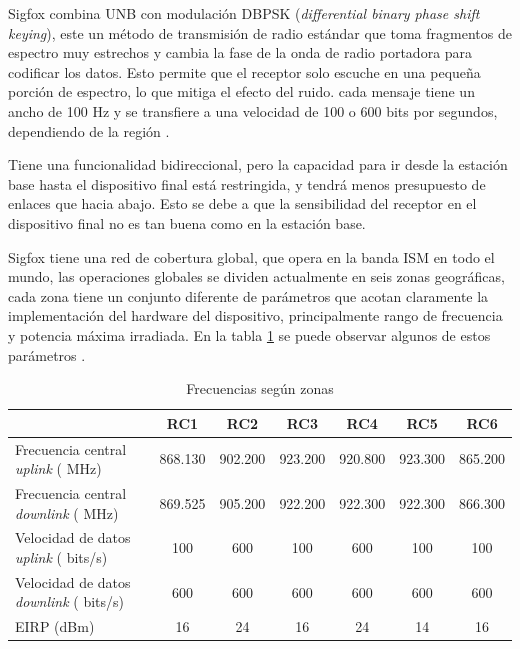 Sigfox combina UNB con modulación  DBPSK (\textit{differential binary phase shift keying}), este un método de transmisión de radio estándar que toma fragmentos de espectro muy estrechos y cambia la fase de la onda de radio portadora para codificar los datos. Esto permite que el receptor solo escuche en una pequeña porción de espectro, lo que mitiga el efecto del ruido. cada mensaje tiene un ancho de 100 Hz y se transfiere a una velocidad de 100 o 600 bits por segundos, dependiendo de la región \cite{RSpec}. %

Tiene una funcionalidad bidireccional, pero la capacidad para ir desde la estación base hasta el dispositivo final está restringida, y tendrá menos presupuesto de enlaces que hacia abajo. Esto se debe a que la sensibilidad del receptor en el dispositivo final no es tan buena como en la estación base.

Sigfox tiene una red de cobertura global, que opera en la banda ISM en todo el mundo, las operaciones globales se dividen actualmente en seis  zonas geográficas, cada zona tiene un conjunto diferente de parámetros que acotan claramente la implementación del hardware del dispositivo, principalmente rango de frecuencia y potencia máxima irradiada. En la tabla \ref{tab:ZonasSigfox} se puede observar algunos de estos parámetros \cite{RConfg}.

\begin{table}[h]
    \small
	\centering
	\caption[Zonas de frecuencia]{Frecuencias según zonas}
	\begin{tabular}{l c c c c c c}    
		\toprule
		\textbf{ } 	   & \textbf{RC1} & \textbf{RC2} 	& \textbf{RC3}  & \textbf{RC4}   & \textbf{RC5}	& \textbf{RC6} \\
		\midrule
		Frecuencia central \textit{uplink} ( MHz)	    & 868.130 	& 902.200	&923.200  &920.800	&923.300 &865.200\\	
		Frecuencia central \textit{downlink} ( MHz) 	& 869.525	& 905.200   &922.200 &922.300	&922.300	&866.300\\
		Velocidad de datos \textit{uplink} ( bits/s)	& 100       &600        &100     &600       &100        &100\\	
		Velocidad de datos \textit{downlink} ( bits/s)	& 600       & 600    	&600     & 600       & 600    	&600\\
		EIRP (dBm)		                             	 & 16       & 24		&16     &24	        &14         &16\\
		\bottomrule
		\hline
	\end{tabular}
	\label{tab:ZonasSigfox}
\end{table}


